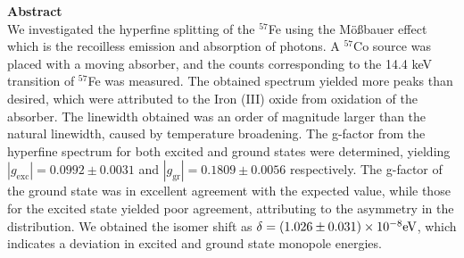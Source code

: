 \documentclass[a4paper]{report}
\numberwithin{equation}{section}
\begin{document}
\begin{titlepage}
	\vspace*{5em}

	\begin{minipage}{0.8\textwidth}
		\begin{centering}
			\textbf{Abstract}\\[0.2cm]
            We investigated the hyperfine splitting of the $^{57}$Fe using the M\"o{\ss}bauer effect which is the
            recoilless emission and absorption of photons. A $^{57}$Co source was placed with a moving 
            absorber, and the counts corresponding to the 14.4 keV transition of $^{57}$Fe was measured. The 
            obtained spectrum yielded more peaks than desired, which were attributed to the Iron (III) oxide
            from oxidation of the absorber. The linewidth obtained was an order of magnitude larger than the natural 
            linewidth, caused by temperature broadening. The g-factor from the hyperfine spectrum for both excited and ground 
            states were determined, yielding $| g_\mathrm{exc} | = 0.0992 \pm 0.0031$ and $| g_\mathrm{gr} | = 0.1809 \pm 0.0056$
            respectively. The g-factor of the ground state was in excellent agreement with the expected value, while those for the 
            excited state yielded poor agreement, attributing to the asymmetry in the distribution. We obtained the 
            isomer shift as $\delta = \num[scientific-notation=true]{0.1026(31)e-7}\si[]{\electronvolt}$, which indicates a deviation in 
            excited and ground state monopole energies. 
		\end{centering}
	\end{minipage}
	
	
	
	
	
	
	 
	
	
\end{titlepage}
\end{document}
